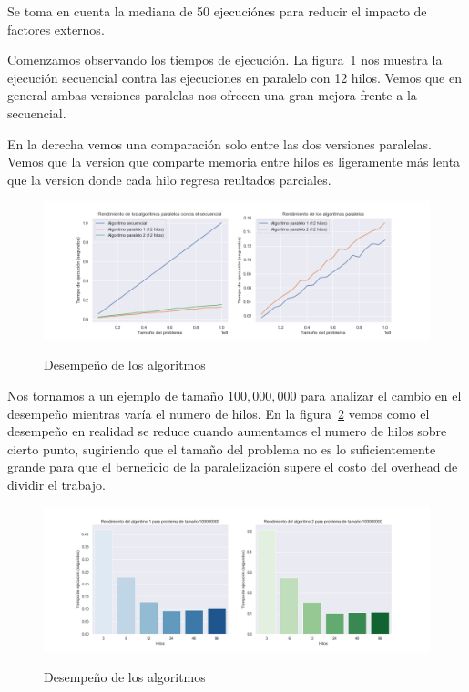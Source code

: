 \documentclass{report}
\begin{document}
Se toma en cuenta la mediana de 50 ejecuciónes para reducir el impacto de factores
externos.

Comenzamos observando los tiempos de ejecución. La figura~\ref{fig:squareperf} nos
muestra la ejecución secuencial contra las ejecuciones en paralelo con 12 hilos.
Vemos que en general ambas versiones paralelas nos ofrecen una gran mejora frente
a la secuencial.

En la derecha vemos una comparación solo entre las dos versiones paralelas. Vemos
que la version que comparte memoria entre hilos es ligeramente más lenta que la
version donde cada hilo regresa reultados parciales.

\begin{figure}[H]
    \centering
  \caption{Desempeño de los algoritmos}
\includegraphics[width=\textwidth]{square-perf}
\label{fig:squareperf}
\end{figure}

Nos tornamos a un ejemplo de tamaño $100,000,000$ para analizar el cambio en el
desempeño mientras varía el numero de hilos. En la figura~\ref{fig:squareperfbar}
vemos como el desempeño en realidad se reduce cuando aumentamos el numero de hilos
sobre cierto punto, sugiriendo que el tamaño del problema no es lo suficientemente
grande para que el berneficio de la paralelización supere el costo del overhead de
dividir el trabajo.

\begin{figure}[H]
    \centering
  \caption{Desempeño de los algoritmos}
\includegraphics[width=\textwidth]{square-perf-bar}
\label{fig:squareperfbar}
\end{figure}
\end{document}

